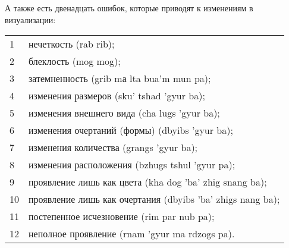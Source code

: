 А также есть двенадцать ошибок, которые приводят к изменениям в визуализации:\\

\begin{tabular}{ll}
1  & нечеткость (rab rib);\\
2  & блеклость (mog mog);\\
3  & затемненность (grib mа lta bua'm mun pa);\\
4  & изменения размеров (sku' tshad 'gyur ba);\\
5  & изменения внешнего вида (cha lugs 'gyur ba);\\
6  & изменения очертаний (формы) (dbyibs 'gyur ba);\\
7  & изменения количества (grangs 'gyur ba);\\
8  & изменения расположения (bzhugs tshul 'gyur pa);\\
9  & проявление лишь как цвета (kha dog 'ba' zhig snang ba);\\
10 & проявление лишь как очертания (dbyibs 'ba' zhigs nang ba);\\
11 & постепенное исчезновение (rim par nub pa);\\
12 & неполное проявление (rnam 'gyur ma rdzogs pa).
\end{tabular}

